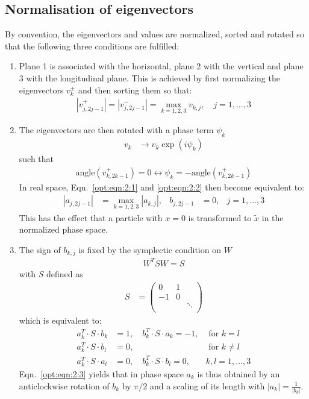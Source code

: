 \subsection{Normalisation of eigenvectors}
\label{opt:sec:2}
By convention, the eigenvectors and values are normalized, sorted and rotated so that the following three conditions are fulfilled:
\begin{enumerate}
\item Plane 1 is associated with the horizontal, plane 2 with the vertical and plane 3 with the longitudinal plane. This is achieved by first normalizing the eigenvectors $v_k^{\pm}$ and then sorting them so that:
\begin{align}\label{opt:eqn:2:1}
|v_{j,2j-1}^{+}| =|v_{j,2j-1}^{-}| = \max_{k=1,2,3} v_{k,j}, \quad j=1,\ldots, 3
\end{align}
\item The eigenvectors are then rotated with a phase term $\psi_k$
\begin{align}
v_k& \to v_k \exp(i \psi_k) 
\end{align}
such that
\begin{align}\label{opt:eqn:2:2}
\mathrm{angle}(v_{k,2k-1}^{+})=0 \leftrightarrow \psi_k=-\mathrm{angle}(v_{k,2k-1}^{+})
\end{align}
In real space, Eqn.~\ref{opt:eqn:2:1} and \ref{opt:eqn:2:2} then become equivalent to:
\begin{align}
|a_{j,2j-1}| &=\max_{k=1,2,3} |a_{k,j}|,& b_{j,2 j-1}&=0, & j=1,\ldots, 3
\end{align}
This has the effect that a particle with $x=0$ is transformed to $\tilde x$ in the normalized phase space.
\item The sign of $b_{k,j}$ is fixed by the symplectic condition on $W$
\begin{align}
W^T S W = S
\end{align}
with $S$ defined as
\begin{align}
S&=\left(
\begin{array}{ccc}
0 & 1  &  \\
-1 & 0  &  \\
&    & \ddots \\
\end{array} 
\right)
\end{align}
which is equivalent to:
\begin{align}\label{opt:eqn:2:3}
a_k^T \cdot S \cdot b_k &=1, \quad b_k^T \cdot S \cdot a_k =-1, & \text{ for } k=l\nonumber\\
a_k^T \cdot S \cdot b_l &=0, & \text{ for }  k\not=l\\
a_k^T \cdot S \cdot a_l &=0, \quad b_k^T \cdot S \cdot b_l =0,  & k,l=1,\ldots,3 \nonumber
\end{align}
Eqn.~\ref{opt:eqn:2:3} yields that in phase space $a_k$ is thus obtained by an anticlockwise rotation of $b_k$ by $\pi/2$ and a scaling of its length with $|a_k|=\frac{1}{|b_k|}$.
\end{enumerate}
